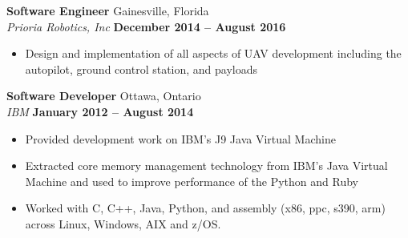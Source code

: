 \documentclass[margin,line]{res}
\begin{document}
\begin{resume}
        {\bf Software Engineer} {\hfill Gainesville, Florida}\\
      {\em Prioria Robotics, Inc} \hfill {\bf December 2014 -- August 2016}
      \begin{itemize} \itemsep -2pt
        \item Design and implementation of all aspects of UAV development including the autopilot, ground control station, and payloads
    
      \end{itemize}
  
        {\bf Software Developer} {\hfill Ottawa, Ontario}\\
      {\em IBM} \hfill {\bf January 2012 -- August 2014}
      \begin{itemize} \itemsep -2pt
        \item Provided development work on IBM's J9 Java Virtual Machine 
        \item Extracted core memory management technology from IBM's Java Virtual Machine and used to improve performance of the Python and Ruby
        \item Worked with C, C++, Java, Python, and assembly (x86, ppc, s390, arm) across Linux, Windows, AIX and z/OS.

      \end{itemize}  


\end{resume}
\end{document}
